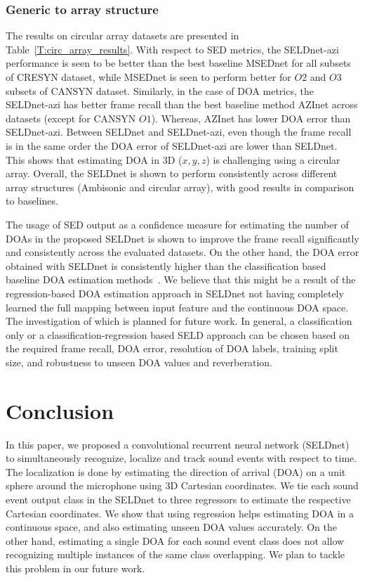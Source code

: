 \documentclass[journal]{IEEEtran}
\begin{document}
\subsubsection{Generic to array structure}
The results on circular array datasets are presented in Table~\ref{T:circ_array_results}. With respect to SED metrics, the SELDnet-azi performance is seen to be better than the best baseline MSEDnet for all subsets of CRESYN dataset, while MSEDnet is seen to perform better for $O2$ and $O3$ subsets of CANSYN dataset. Similarly, in the case of DOA metrics, the SELDnet-azi has better frame recall than the best baseline method AZInet across datasets (except for CANSYN $O1$). Whereas, AZInet has lower DOA error than SELDnet-azi. Between SELDnet and SELDnet-azi, even though the frame recall is in the same order the DOA error of SELDnet-azi are lower than SELDnet. This shows that estimating DOA in 3D ($x,y,z$) is challenging using a circular array. Overall, the SELDnet is shown to perform consistently across different array structures (Ambisonic and circular array), with good results in comparison to baselines. 

The usage of SED output as a confidence measure for estimating the number of DOAs in the proposed SELDnet is shown to improve the frame recall significantly and consistently across the evaluated datasets. On the other hand, the DOA error obtained with SELDnet is consistently higher than the classification based baseline DOA estimation methods~\cite{Chakrabarty2017_nips, Adavanne2018_EUSIPCO}. We believe that this might be a result of the regression-based DOA estimation approach in SELDnet not having completely learned the full mapping between input feature and the continuous DOA space. The investigation of which is planned for future work. In general, a classification only or a classification-regression based SELD approach can be chosen based on the required frame recall, DOA error, resolution of DOA labels, training split size, and robustness to unseen DOA values and reverberation.



\section{Conclusion}
\label{sec:conclusion}
In this paper, we proposed a convolutional recurrent neural network (SELDnet) to simultaneously recognize, localize and track sound events with respect to time. The localization is done by estimating the direction of arrival (DOA) on a unit sphere around the microphone using 3D Cartesian coordinates. We tie each sound event output class in the SELDnet to three regressors to estimate the respective Cartesian coordinates. We show that using regression helps estimating DOA in a continuous space, and also estimating unseen DOA values accurately. On the other hand, estimating a single DOA for each sound event class does not allow recognizing multiple instances of the same class overlapping. We plan to tackle this problem in our future work. 
\end{document}
